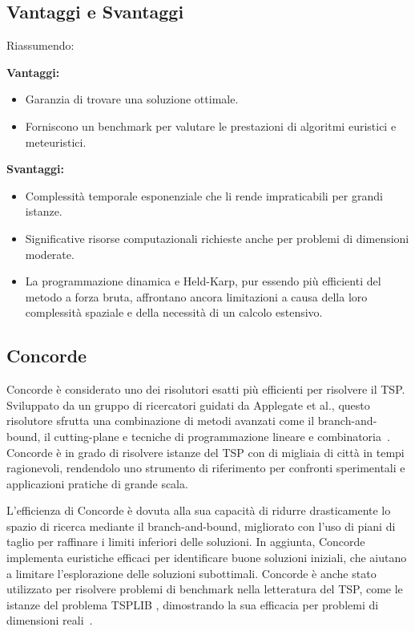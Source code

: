\subsection{Vantaggi e Svantaggi}

Riassumendo:

\textbf{Vantaggi:}
\begin{itemize}
	\item Garanzia di trovare una soluzione ottimale.
	\item Forniscono un benchmark per valutare le prestazioni di algoritmi euristici e meteuristici.
\end{itemize}

\textbf{Svantaggi:}
\begin{itemize}
	\item Complessità temporale esponenziale che li rende impraticabili per grandi istanze.
	\item Significative risorse computazionali richieste anche per problemi di dimensioni moderate.
	\item La programmazione dinamica e Held-Karp, pur essendo più efficienti del metodo a forza bruta, affrontano ancora limitazioni a causa della loro complessità spaziale e della necessità di un calcolo estensivo.
\end{itemize}


\subsection{Concorde}


Concorde è considerato uno dei risolutori esatti più efficienti per risolvere il \gls{TSP}. Sviluppato da un gruppo di ricercatori guidati da Applegate et al., questo risolutore sfrutta una combinazione di metodi avanzati come il branch-and-bound, il cutting-plane e tecniche di programmazione lineare e combinatoria~\cite{Applegate2007}. Concorde è in grado di risolvere istanze del \gls{TSP} con di migliaia di città in tempi ragionevoli, rendendolo uno strumento di riferimento per confronti sperimentali e applicazioni pratiche di grande scala.

L'efficienza di Concorde è dovuta alla sua capacità di ridurre drasticamente lo spazio di ricerca mediante il branch-and-bound, migliorato con l'uso di piani di taglio per raffinare i limiti inferiori delle soluzioni. In aggiunta, Concorde implementa euristiche efficaci per identificare buone soluzioni iniziali, che aiutano a limitare l'esplorazione delle soluzioni subottimali. Concorde è anche stato utilizzato per risolvere problemi di benchmark nella letteratura del \gls{TSP}, come le istanze del problema TSPLIB \cite{TSPLIB}, dimostrando la sua efficacia per problemi di dimensioni reali~\cite{Cook2011}.

